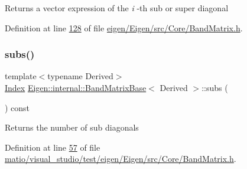 \begin{DoxyReturn}{Returns}
a vector expression of the {\itshape i} -\/th sub or super diagonal 
\end{DoxyReturn}


Definition at line \hyperlink{eigen_2_eigen_2src_2_core_2_band_matrix_8h_source_l00128}{128} of file \hyperlink{eigen_2_eigen_2src_2_core_2_band_matrix_8h_source}{eigen/\+Eigen/src/\+Core/\+Band\+Matrix.\+h}.

\mbox{\label{class_eigen_1_1internal_1_1_band_matrix_base_a1115fe9b5a07d5218dacc15655a413cb}} 
\subsubsection{\texorpdfstring{subs()}{subs()}\hspace{0.1cm}{\footnotesize\ttfamily [1/2]}}
{\footnotesize\ttfamily template$<$typename Derived$>$ \\
\hyperlink{group___core___module_a554f30542cc2316add4b1ea0a492ff02}{Index} \hyperlink{class_eigen_1_1internal_1_1_band_matrix_base}{Eigen\+::internal\+::\+Band\+Matrix\+Base}$<$ Derived $>$\+::subs (\begin{DoxyParamCaption}{ }\end{DoxyParamCaption}) const\hspace{0.3cm}{\ttfamily [inline]}}

\begin{DoxyReturn}{Returns}
the number of sub diagonals 
\end{DoxyReturn}


Definition at line \hyperlink{matio_2visual__studio_2test_2eigen_2_eigen_2src_2_core_2_band_matrix_8h_source_l00057}{57} of file \hyperlink{matio_2visual__studio_2test_2eigen_2_eigen_2src_2_core_2_band_matrix_8h_source}{matio/visual\+\_\+studio/test/eigen/\+Eigen/src/\+Core/\+Band\+Matrix.\+h}.

\mbox{\label{class_eigen_1_1internal_1_1_band_matrix_base_a1115fe9b5a07d5218dacc15655a413cb}} 
